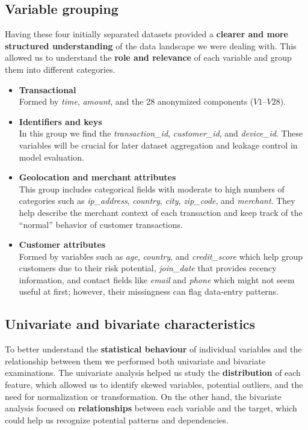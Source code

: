 \documentclass[12pt]{report} %
\begin{document}
\subsection{Variable grouping}
Having these four initially separated datasets provided a \textbf{clearer and more structured understanding} of the data landscape we were dealing with. This allowed us to understand the \textbf{role and relevance} of each variable and group them into different categories.
\begin{itemize}
    \item \textbf{Transactional} \\
    Formed by \textit{time}, \textit{amount}, and the 28 anonymized components (\(V1\)--\(V28\)).

    \item \textbf{Identifiers and keys} \\
    In this group we find the \textit{transaction\_id}, \textit{customer\_id}, and \textit{device\_id}. 
    These variables will be crucial for later dataset aggregation and leakage control in model evaluation.

    \item \textbf{Geolocation and merchant attributes} \\
    This group includes categorical fields with moderate to high numbers of categories such as 
    \textit{ip\_address}, \textit{country}, \textit{city}, \textit{zip\_code}, and \textit{merchant}. 
    They help describe the merchant context of each transaction and keep track of the “normal” behavior of customer transactions.

    \item \textbf{Customer attributes} \\
    Formed by variables such as \textit{age}, \textit{country}, and \textit{credit\_score} which help group customers due to their risk potential, 
    \textit{join\_date} that provides recency information, and contact fields like \textit{email} and \textit{phone} which might not seem useful at first; 
    however, their missingness can flag data-entry patterns.
\end{itemize}

\subsection{Univariate and bivariate characteristics}
To better understand the \textbf{statistical behaviour} of individual variables and the relationship between them we performed both univariate and bivariate examinations. The univariate analysis helped us study the \textbf{distribution} of each feature, which allowed us to identify skewed variables, potential outliers, and the need for normalization or transformation. On the other hand, the bivariate analysis focused on \textbf{relationships} between each variable and the target, which could help us recognize potential patterns and dependencies.
\end{document}

